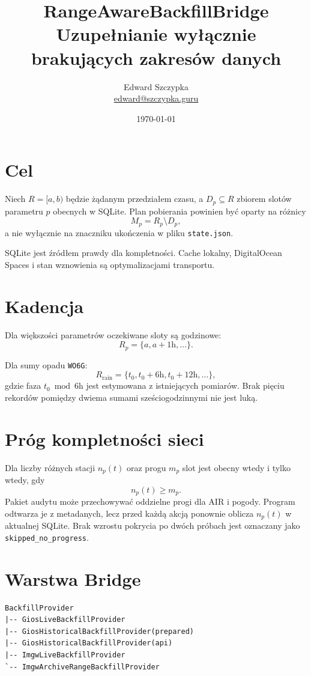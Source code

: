 \documentclass[11pt,a4paper]{article}
\title{RangeAwareBackfillBridge\\
Uzupełnianie wyłącznie brakujących zakresów danych}
\author{Edward Szczypka\\\href{mailto:edward@szczypka.guru}{edward@szczypka.guru}}
\date{\today}
\begin{document}
\maketitle

\section{Cel}

Niech $R=[a,b)$ będzie żądanym przedziałem czasu, a $D_p\subseteq R$
zbiorem slotów parametru $p$ obecnych w SQLite. Plan pobierania powinien być
oparty na różnicy
\[
  M_p = R_p \setminus D_p,
\]
a nie wyłącznie na znaczniku ukończenia w pliku \texttt{state.json}.

SQLite jest źródłem prawdy dla kompletności. Cache lokalny, DigitalOcean
Spaces i stan wznowienia są optymalizacjami transportu.

\section{Kadencja}

Dla większości parametrów oczekiwane sloty są godzinowe:
\[
  R_p=\{a,a+1\mathrm{h},\ldots\}.
\]

Dla sumy opadu \texttt{WO6G}:
\[
  R_{\mathrm{rain}}
  =\{t_0,t_0+6\mathrm{h},t_0+12\mathrm{h},\ldots\},
\]
gdzie faza $t_0\bmod 6\mathrm{h}$ jest estymowana z istniejących pomiarów.
Brak pięciu rekordów pomiędzy dwiema sumami sześciogodzinnymi nie jest luką.

\section{Próg kompletności sieci}

Dla liczby różnych stacji $n_p(t)$ oraz progu $m_p$ slot jest obecny wtedy i
tylko wtedy, gdy
\[
  n_p(t)\ge m_p.
\]
Pakiet audytu może przechowywać oddzielne progi dla AIR i pogody. Program
odtwarza je z metadanych, lecz przed każdą akcją ponownie oblicza $n_p(t)$ w
aktualnej SQLite. Brak wzrostu pokrycia po dwóch próbach jest oznaczany jako
\texttt{skipped\_no\_progress}.

\section{Warstwa Bridge}

\begin{lstlisting}
BackfillProvider
|-- GiosLiveBackfillProvider
|-- GiosHistoricalBackfillProvider(prepared)
|-- GiosHistoricalBackfillProvider(api)
|-- ImgwLiveBackfillProvider
`-- ImgwArchiveRangeBackfillProvider
\end{lstlisting}
\end{document}
